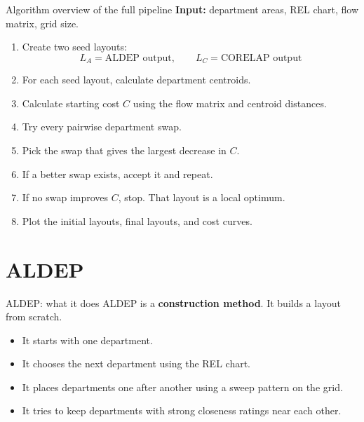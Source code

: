 \documentclass[aspectratio=169,10pt]{beamer}
\begin{document}
\begin{frame}[t]{Algorithm overview of the full pipeline}
  \RaggedRight
  \footnotesize
  \textbf{Input:} department areas, REL chart, flow matrix, grid size.

  \vspace{0.35em}
  \begin{enumerate}
    \setlength{\itemsep}{0.3em}
    \item Create two seed layouts:
      \[
        L_A = \text{ALDEP output}, \qquad L_C = \text{CORELAP output}
      \]
    \item For each seed layout, calculate department centroids.
    \item Calculate starting cost $C$ using the flow matrix and centroid distances.
    \item Try every pairwise department swap.
    \item Pick the swap that gives the largest decrease in $C$.
    \item If a better swap exists, accept it and repeat.
    \item If no swap improves $C$, stop. That layout is a local optimum.
    \item Plot the initial layouts, final layouts, and cost curves.
  \end{enumerate}
\end{frame}

\section{ALDEP}

\begin{frame}[t]{ALDEP: what it does}
  \RaggedRight
  \small
  ALDEP is a \textbf{construction method}. It builds a layout from scratch.

  \vspace{0.55em}
  \begin{itemize}
    \setlength{\itemsep}{0.35em}
    \item It starts with one department.
    \item It chooses the next department using the REL chart.
    \item It places departments one after another using a sweep pattern on the grid.
    \item It tries to keep departments with strong closeness ratings near each other.
  \end{itemize}
\end{frame}
\end{document}
